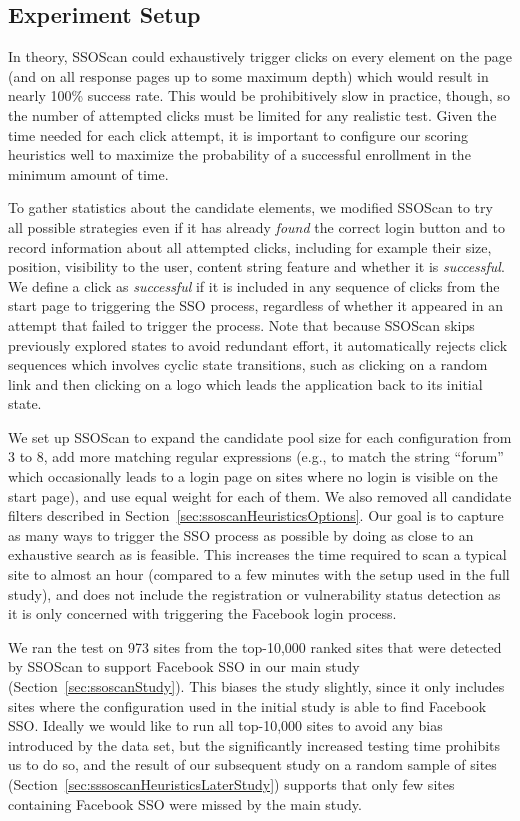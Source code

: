 \subsection{Experiment Setup}
\label{sec:ssoscanHeuristicsHeuristicsEval}

In theory, SSOScan could exhaustively trigger clicks on every element on the page (and on all response pages up to some maximum depth) which would result in nearly 100\% success rate.  This would be prohibitively slow in practice, though, so the number of attempted clicks must be limited for any realistic test.  Given the time needed for each click attempt, it is important to configure our scoring heuristics well to maximize the probability of a successful enrollment in the minimum amount of time.  

To gather statistics about the candidate elements, we modified SSOScan to try all possible strategies even if it has already \emph{found} the correct login button and to record information about all attempted clicks, including for example their size, position, visibility to the user, content string feature and whether it is \emph{successful}.  We define a click as \emph{successful} if it is included in any sequence of clicks from the start page to triggering the SSO process, regardless of whether it appeared in an attempt that failed to trigger the process.  Note that because SSOScan skips previously explored states to avoid redundant effort, it automatically rejects click sequences which involves cyclic state transitions, such as clicking on a random link and then clicking on a logo which leads the application back to its initial state.

We set up SSOScan to expand the candidate pool size for each configuration from 3 to 8, add more matching regular expressions (e.g., to match the string ``forum'' which occasionally leads to a login page on sites where no login is visible on the start page), and use equal weight for each of them.  We also removed all candidate filters described in Section~\ref{sec:ssoscanHeuristicsOptions}.  Our goal is to capture as many ways to trigger the SSO process as possible by doing as close to an exhaustive search as is feasible.  This increases the time required to scan a typical site to almost an hour (compared to a few minutes with the setup used in the full study), and does not include the registration or vulnerability status detection as it is only concerned with triggering the Facebook login process.

We ran the test on 973 sites from the top-10,000 ranked sites that were detected by SSOScan to support Facebook SSO in our main study (Section~\ref{sec:ssoscanStudy}).  This biases the study slightly, since it only includes sites where the configuration used in the initial study is able to find Facebook SSO.  Ideally we would like to run all top-10,000 sites to avoid any bias introduced by the data set, but the significantly increased testing time prohibits us to do so, and the result of our subsequent study on a random sample of sites (Section~\ref{sec:sssoscanHeuristicsLaterStudy}) supports that only few sites containing Facebook SSO were missed by the main study.

